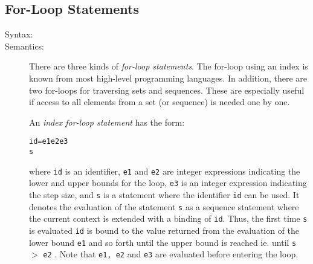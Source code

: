 \documentclass[\pformat,12pt]{article}
\begin{document}
\subsection{For-Loop Statements}

\begin{description}
\item[Syntax:]




\item[Semantics:] There are three kinds of {\it for-loop statements}. The
  for-loop using an index is known from most high-level programming
  languages. In addition, there are two for-loops for traversing sets and
  sequences. These are especially useful if access to all
  elements from a set (or sequence) is needed one by one.

  An {\it index for-loop statement} has the form:
  \begin{alltt}
     id = e1  e2  e3 
    s
  \end{alltt}
  where {\tt id} is an identifier, {\tt e1} and {\tt e2} are integer
  expressions indicating the lower and upper bounds for the loop, {\tt e3}
  is an integer expression indicating the step size, and {\tt s} is a
  statement where the identifier {\tt id} can be used. It denotes the
  evaluation of the statement {\tt s} as a sequence statement where the
  current context is extended with a binding of {\tt id}. Thus, the first
  time {\tt s} is evaluated {\tt id} is bound to the value returned from
  the evaluation of the lower bound {\tt e1} and so forth until the upper
  bound is reached ie. until \texttt{s} $>$ \texttt{e2} . Note that
  {\tt e1, e2} and {\tt e3} are evaluated before entering the loop.


\end{description}
\end{document}
